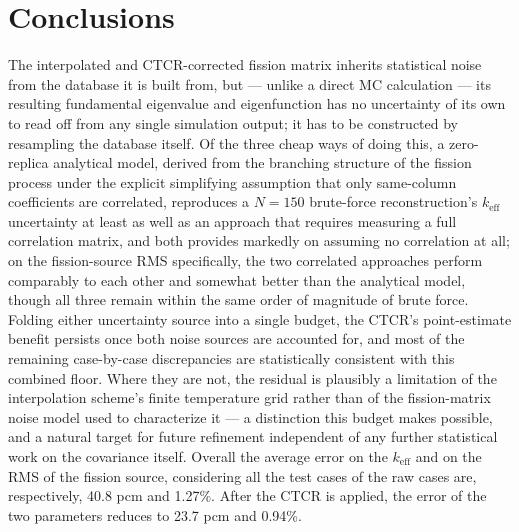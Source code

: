 \documentclass{style/nseJournal}
\begin{document}


\FloatBarrier
\section{Conclusions}
\label{sec:conclusions}

The interpolated and CTCR-corrected fission matrix inherits statistical noise from the database it is built from, but --- unlike a direct MC calculation --- its resulting fundamental eigenvalue and eigenfunction has no uncertainty of its own to read off from any single simulation output; it has to be constructed by resampling the database itself. Of the three cheap ways of doing this, a zero-replica analytical model, derived from the branching structure of the fission process under the explicit simplifying assumption that only same-column coefficients are correlated, reproduces a $N=150$ brute-force reconstruction's $k_{\text{eff}}$ uncertainty at least as well as an approach that requires measuring a full correlation matrix, and both provides markedly on assuming no correlation at all; on the fission-source RMS specifically, the two correlated approaches perform comparably to each other and somewhat better than the analytical model, though all three remain within the same order of magnitude of brute force. Folding either uncertainty source into a single budget, the CTCR's point-estimate benefit persists once both noise sources are accounted for, and most of the remaining case-by-case discrepancies are statistically consistent with this combined floor. Where they are not, the residual is plausibly a limitation of the interpolation scheme's finite temperature grid rather than of the fission-matrix noise model used to characterize it --- a distinction this budget makes possible, and a natural target for future refinement independent of any further statistical work on the covariance itself.
Overall the average error on the $k_{\text{eff}}$ and on the RMS of the fission source, considering all the test cases of the raw cases are, respectively, 40.8 pcm and 1.27\%. After the CTCR is applied, the error of the two parameters reduces to 23.7 pcm and 0.94\%.
\end{document}
